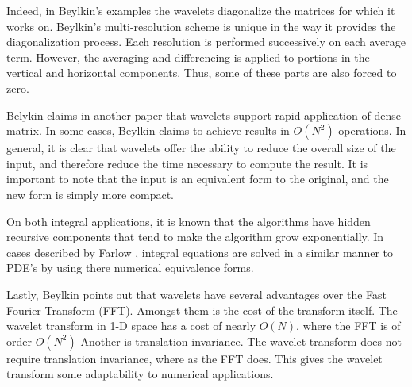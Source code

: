 Indeed, in Beylkin's examples the wavelets diagonalize the matrices for which it works on.  Beylkin's multi-resolution scheme is unique in the way it provides the diagonalization process.  %
Each resolution is performed successively on each average term.  However, the averaging and differencing is applied to portions in the vertical and horizontal components.  Thus, some of these parts are also forced to zero. %


Belykin claims in another paper that wavelets support rapid application of dense matrix.  In some cases, Beylkin claims to achieve results %
 in $O(N^2)$ operations.  In general, it is clear that wavelets offer the ability to reduce the overall size of the input, and therefore reduce the time necessary to compute the result.  It is important to note that the input is an equivalent form to the original, and the new form is simply more compact.  

On both integral applications, it is known that the algorithms have hidden recursive components that tend to make the algorithm grow exponentially.    In cases described by Farlow \cite{PDEfSE}, integral equations are solved in a similar manner to PDE's by using there numerical equivalence forms.  

Lastly, Beylkin points out that wavelets have several advantages over the Fast Fourier Transform (FFT).  Amongst them is the cost of the transform itself.  The wavelet transform in 1-D space has a cost of nearly $O (N)$. where the FFT is of order $O(N^2)$  Another is translation invariance.  The wavelet transform does not require translation invariance, where as the FFT does.  This gives the wavelet transform some adaptability to numerical applications.  





